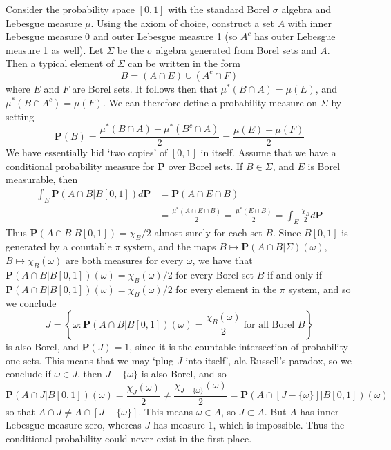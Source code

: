 \begin{example}
    Consider the probability space $[0,1]$ with the standard Borel $\sigma$ algebra and Lebesgue measure $\mu$. Using the axiom of choice, construct a set $A$ with inner Lebesgue measure 0 and outer Lebesgue measure 1 (so $A^c$ has outer Lebesgue measure 1 as well). Let $\Sigma$ be the $\sigma$ algebra generated from Borel sets and $A$. Then a typical element of $\Sigma$ can be written in the form
    \[ B = (A \cap E) \cup (A^c \cap F) \]
    where $E$ and $F$ are Borel sets. It follows then that $\mu^*(B \cap A) = \mu(E)$, and $\mu^*(B \cap A^c) = \mu(F)$. We can therefore define a probability measure on $\Sigma$ by setting
    \[ \mathbf{P}(B) = \frac{\mu^*(B \cap A) + \mu^*(B^c \cap A)}{2} = \frac{\mu(E) + \mu(F)}{2} \]
    We have essentially hid `two copies' of $[0,1]$ in itself. Assume that we have a conditional probability measure for $\mathbf{P}$ over Borel sets. If $B \in \Sigma$, and $E$ is Borel measurable, then
    \begin{align*}
        \int_E \mathbf{P}(A \cap B|B [0,1]) d\mathbf{P} &= \mathbf{P}(A \cap E \cap B)\\
        &= \frac{\mu^*(A \cap E \cap B)}{2} = \frac{\mu^*(E \cap B)}{2} = \int_E \frac{\chi_B}{2} d\mathbf{P}
    \end{align*}
    Thus $\mathbf{P}(A \cap B|B[0,1]) = \chi_B/2$ almost surely for each set $B$. Since $B[0,1]$ is generated by a countable $\pi$ system, and the maps $B \mapsto \mathbf{P}(A \cap B|\Sigma)(\omega)$, $B \mapsto \chi_B(\omega)$ are both measures for every $\omega$, we have that $\mathbf{P}(A \cap B|B[0,1])(\omega) = \chi_B(\omega)/2$ for every Borel set $B$ if and only if $\mathbf{P}(A \cap B|B[0,1])(\omega) = \chi_B(\omega)/2$ for every element in the $\pi$ system, and so we conclude
    \[ J = \left\{ \omega: \mathbf{P}(A \cap B|B[0,1])(\omega) = \frac{\chi_B(\omega)}{2}\ \text{for all Borel $B$} \right\} \]
    is also Borel, and $\mathbf{P}(J) = 1$, since it is the countable intersection of probability one sets. This means that we may `plug $J$ into itself', ala Russell's paradox, so we conclude if $\omega \in J$, then $J - \{ \omega \}$ is also Borel, and so
    \[ \mathbf{P}(A \cap J|B[0,1])(\omega) = \frac{\chi_J(\omega)}{2} \neq \frac{\chi_{J - \{ \omega \}}(\omega)}{2} = \mathbf{P}(A \cap [J - \{ \omega \}]|B[0,1])(\omega) \]
    so that $A \cap J \neq A \cap [J - \{ \omega \}]$. This means $\omega \in A$, so $J \subset A$. But $A$ has inner Lebesgue measure zero, whereas $J$ has measure 1, which is impossible. Thus the conditional probability could never exist in the first place.
\end{example}

